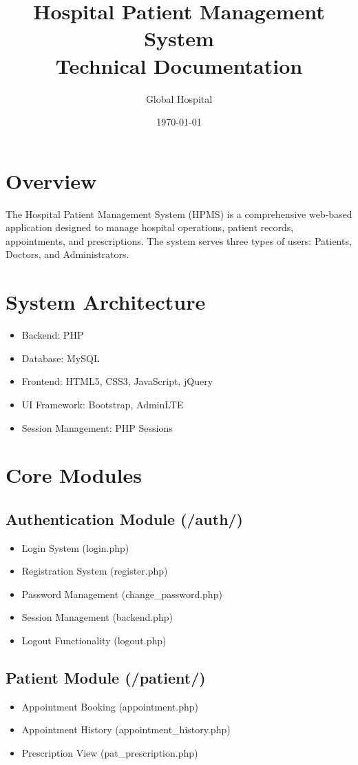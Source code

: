 \documentclass[11pt,a4paper]{article}
\title{
    {\Huge\textbf{Hospital Patient Management System}}\\
    \Large{Technical Documentation}
}
\author{Global Hospital}
\date{\today}
\begin{document}
\maketitle
\newpage

\tableofcontents
\newpage

\section{Overview}
The Hospital Patient Management System (HPMS) is a comprehensive web-based application designed to manage hospital operations, patient records, appointments, and prescriptions. The system serves three types of users: Patients, Doctors, and Administrators.

\section{System Architecture}
\begin{itemize}
    \item Backend: PHP
    \item Database: MySQL
    \item Frontend: HTML5, CSS3, JavaScript, jQuery
    \item UI Framework: Bootstrap, AdminLTE
    \item Session Management: PHP Sessions
\end{itemize}

\section{Core Modules}

\subsection{Authentication Module (/auth/)}
\begin{itemize}
    \item Login System (login.php)
    \item Registration System (register.php)
    \item Password Management (change\_password.php)
    \item Session Management (backend.php)
    \item Logout Functionality (logout.php)
\end{itemize}

\subsection{Patient Module (/patient/)}
\begin{itemize}
    \item Appointment Booking (appointment.php)
    \item Appointment History (appointment\_history.php)
    \item Prescription View (pat\_prescription.php)
\end{itemize}
\end{document}
